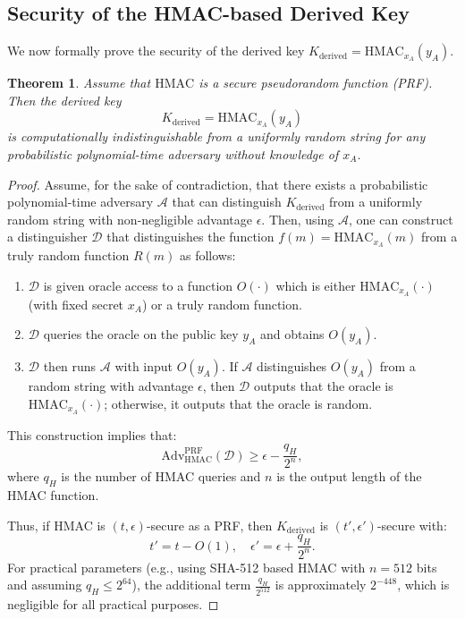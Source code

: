 \documentclass{article}
\newtheorem{theorem}{Theorem}
\begin{document}
\subsection{Security of the HMAC-based Derived Key}
We now formally prove the security of the derived key \(K_{\text{derived}} = \mathrm{HMAC}_{x_A}(y_A)\).

\begin{theorem}
Assume that \( \mathrm{HMAC} \) is a secure pseudorandom function (PRF). Then the derived key 
\[
K_{\text{derived}} = \mathrm{HMAC}_{x_A}(y_A)
\]
is computationally indistinguishable from a uniformly random string for any probabilistic polynomial-time adversary without knowledge of \(x_A\).
\end{theorem}

\begin{proof}
Assume, for the sake of contradiction, that there exists a probabilistic polynomial-time adversary \(\mathcal{A}\) that can distinguish \(K_{\text{derived}}\) from a uniformly random string with non-negligible advantage \(\epsilon\). Then, using \(\mathcal{A}\), one can construct a distinguisher \(\mathcal{D}\) that distinguishes the function \(f(m) = \mathrm{HMAC}_{x_A}(m)\) from a truly random function \(R(m)\) as follows:
\begin{enumerate}
    \item \(\mathcal{D}\) is given oracle access to a function \(O(\cdot)\) which is either \( \mathrm{HMAC}_{x_A}(\cdot)\) (with fixed secret \(x_A\)) or a truly random function.
    \item \(\mathcal{D}\) queries the oracle on the public key \(y_A\) and obtains \(O(y_A)\).
    \item \(\mathcal{D}\) then runs \(\mathcal{A}\) with input \(O(y_A)\). If \(\mathcal{A}\) distinguishes \(O(y_A)\) from a random string with advantage \(\epsilon\), then \(\mathcal{D}\) outputs that the oracle is \( \mathrm{HMAC}_{x_A}(\cdot)\); otherwise, it outputs that the oracle is random.
\end{enumerate}
This construction implies that:
\[
\text{Adv}^{\text{PRF}}_{\text{HMAC}}(\mathcal{D}) \geq \epsilon - \frac{q_H}{2^n},
\]
where \(q_H\) is the number of HMAC queries and \(n\) is the output length of the HMAC function.

Thus, if HMAC is \((t,\epsilon)\)-secure as a PRF, then \(K_{\text{derived}}\) is \((t',\epsilon')\)-secure with:
\[
t' = t - O(1), \quad \epsilon' = \epsilon + \frac{q_H}{2^n}.
\]
For practical parameters (e.g., using SHA-512 based HMAC with \( n = 512 \) bits and assuming \(q_H \leq 2^{64}\)), the additional term \(\frac{q_H}{2^{512}}\) is approximately \(2^{-448}\), which is negligible for all practical purposes.
\end{proof}
\end{document}
